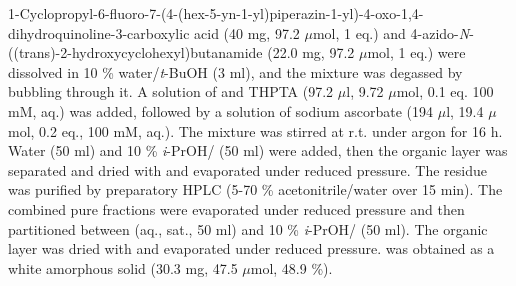 1-Cyclopropyl-6-fluoro-7-(4-(hex-5-yn-1-yl)piperazin-1-yl)-4-oxo-1,4\hyp{}dihydro\-quinoline-3-carboxylic acid  (40 mg, 97.2 $\mu$mol, 1 eq.) and 4\hyp{}azido\hyp{}\textit{N}\hyp{}((trans)\hyp{}2\hyp{}hydroxycyclohexyl)butanamide   (22.0 mg, 97.2 $\mu$mol, 1 eq.) were dissolved in 10 \% water/\textit{t}-BuOH (3 ml), and the mixture was degassed by bubbling  through it. 
A solution of  and THPTA (97.2 $\mu$l, 9.72 $\mu$mol, 0.1 eq. 100 mM, aq.) was added, followed by a solution of sodium ascorbate (194 $\mu$l, 19.4 $\mu$mol, 0.2 eq., 100 mM, aq.). 
The mixture was stirred at r.t. under argon for 16 h. Water (50 ml) and 10 \% \textit{i}-PrOH/ (50 ml) were added, then the organic layer was separated and dried with  and evaporated under reduced pressure. The residue was purified by preparatory HPLC (5-70 \% acetonitrile/water over 15 min). 
The combined pure fractions were evaporated under reduced pressure and then partitioned between  (aq., sat., 50 ml) and 10 \% \textit{i}-PrOH/ (50 ml). The organic layer was dried with  and evaporated under reduced pressure.
 was obtained as a white amorphous solid (30.3 mg, 47.5 $\mu$mol, 48.9 \%).
\\[1\baselineskip]
\\[1\baselineskip]
